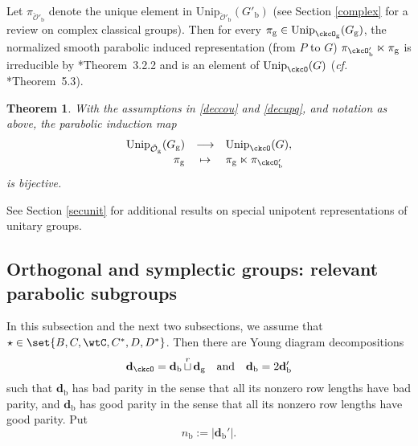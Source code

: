 \documentclass[12pt,a4paper]{amsart}
\def\abs#1{\left|{#1}\right|}
\newcommand{\CO}{{\mathcal {O}}}
\newcommand{\be}{\begin {equation}}
\newcommand{\ee}{\end {equation}}
\numberwithin{equation}{section}
\newtheorem{thm}{Theorem}[section]
\theoremstyle{remark}
\def\cf{\emph{cf.} }
\def\Unip{\mathrm{Unip}}
\def\cuprow{{\stackrel{r}{\sqcup}}}
\def\cuprow{{\,\stackrel{r}{\sqcup}\,}}
\def\ckcOpb{\ckcO'_{\mathrm b}}
\def\Gg{G_{\mathrm g}}
\begin{document}
  Let $\pi_{\check \CO'_{\mathrm b}}$ denote the
unique element in $\Unip_{\check \CO'_{\mathrm b}}(G'_{\mathrm b})$ (see Section \ref{complex} for a review on complex classical groups). Then for
every $\pi_\mathrm g\in \Unip_{\ckcO_{\mathrm g}}(\Gg)$, the normalized smooth parabolic
induced representation (from $P$ to $G$) $\pi_{\ckcOpb}  \ltimes \pi_\mathrm g$ is irreducible by
\cite{Mat96}*{Theorem~3.2.2} and is an element of $\Unip_{\ckcO}(G)$ (\cf
\cite{MR.U}*{Theorem~5.3}).



\begin{thm}\label{thmu2}
 With the assumptions in \eqref{deccou} and \eqref{decupq}, and notation as above, the parabolic induction map
  \begin{equation}
  \label{bij00}
    \begin{array}{rcl}
      \mathrm{Unip}_{\check{\CO}_\mathrm g}(G_\mathrm g)&\longrightarrow &\mathrm{Unip}_{\ckcO}(G),\\
      \pi_{\mathrm g}& \mapsto & \pi_\mathrm g\ltimes \pi_{\ckcOpb} \\
    \end{array}
  \end{equation}
  is bijective.
\end{thm}


See Section \ref{secunit} for additional results on special unipotent representations of unitary groups.


\subsection{Orthogonal and symplectic groups: relevant parabolic subgroups}
\label{secrgp0}
In this subsection and the next two subsections,  we assume that
$\star\in \set{ B, C, \wtC,C^*,D, D^*}$.
Then there are Young diagram decompositions
\be\label{decdo}
 \mathbf d_\ckcO=\mathbf d_\mathrm b\cuprow \mathbf d_\mathrm g\quad\textrm{and}\quad \mathbf d_\mathrm b=2 \mathbf d_\mathrm b'
\ee
 such that $\mathbf d_\mathrm b$ has bad parity in the sense that all its nonzero row
lengths have bad parity, and $\mathbf d_\mathrm b$ has good parity in the sense that all its
nonzero row lengths have good parity.
Put
\be\label{nb000}
  n_\mathrm b:=\abs{\mathbf d_\mathrm b'}. %
\ee
\end{document}
